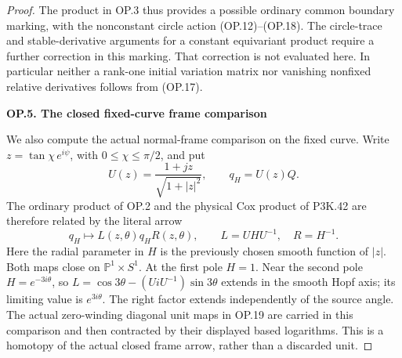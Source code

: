 \begin{proof}
The product in OP.3 thus provides a possible ordinary common boundary
marking, with the nonconstant circle action (OP.12)--(OP.18). The
circle-trace and stable-derivative arguments for a constant equivariant
product require a further correction in this marking. That correction
is not evaluated here. In particular neither a rank-one initial
variation matrix nor vanishing nonfixed relative derivatives follows
from (OP.17).

\par

\medskip\noindent\textbf{OP.5. The closed fixed-curve frame comparison}

\par\nobreak

We also compute the actual normal-frame comparison on the fixed
curve. Write \(z=\tan\chi\,e^{i\psi}\), with
\(0\leq\chi\leq\pi/2\), and put
\[
 U(z)=\frac{1+jz}{\sqrt{1+|z|^2}},\qquad q_H=U(z)Q.
\]
The ordinary product of OP.2 and the physical Cox product of P3K.42
are therefore related by the literal arrow
\[
 q_H\longmapsto L(z,\theta)q_H R(z,\theta),\qquad
 L=UHU^{-1},\quad R=H^{-1}.                         \tag{OP.20}
\]
Here the radial parameter in \(H\) is the previously chosen smooth
function of \(|z|\). Both maps close on \(\mathbb P^1\times S^1\).
At the first pole \(H=1\). Near the second pole \(H=e^{-3i\theta}\),
so \(L=\cos3\theta-(UiU^{-1})\sin3\theta\) extends in the smooth
Hopf axis; its limiting value is \(e^{3i\theta}\). The right factor
extends independently of the source angle. The actual zero-winding
diagonal unit maps in OP.19 are carried in this comparison and then
contracted by their displayed based logarithms. This is a homotopy
of the actual closed frame arrow, rather than a discarded unit.


\end{proof}
